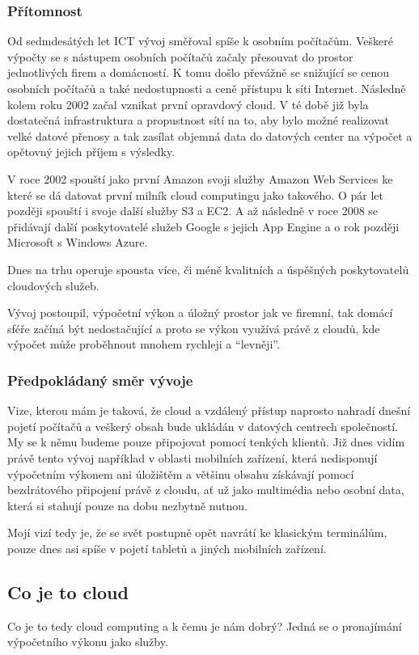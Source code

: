 \subsubsection{Přítomnost}
Od sedmdesátých let ICT vývoj směřoval spíše k osobním počítačům. Veškeré výpočty se s nástupem osobních počítačů začaly přesouvat do prostor jednotlivých firem a domácností. K tomu došlo převážně se snižující se cenou osobních počítačů a také nedostupnosti a ceně přístupu k síti Internet. Následně kolem roku 2002 začal vznikat první opravdový cloud. V té době již byla dostatečná infrastruktura a propustnost sítí na to, aby bylo možné realizovat velké datové přenosy a tak zasílat objemná data do datových center na výpočet a opětovný jejich příjem s výsledky.

V roce 2002 spouští jako první Amazon svoji služby Amazon Web Services ke které se dá datovat první milník cloud computingu jako takového. O pár let později spouští i svoje další služby S3 a EC2. A až následně v roce 2008 se přidávají další poskytovatelé služeb Google s jejich App Engine a o rok později Microsoft s Windows Azure.

Dnes na trhu operuje spousta více, či méně kvalitních a úspěšných poskytovatelů cloudových služeb.

Vývoj postoupil, výpočetní výkon a úložný prostor jak ve firemní, tak domácí sféře začíná být nedostačující a proto se výkon využívá právě z cloudů, kde výpočet může proběhnout mnohem rychleji a "`levněji"'.

\subsubsection{Předpokládaný směr vývoje}
Vize, kterou mám je taková, že cloud a vzdálený přístup naprosto nahradí dnešní pojetí počítačů a veškerý obsah bude ukládán v datových centrech společností. My se k němu budeme pouze připojovat pomocí tenkých klientů. Již dnes vidím právě tento vývoj například v oblasti mobilních zařízení, která nedisponují výpočetním výkonem ani úložištěm a většinu obsahu získávají pomocí bezdrátového připojení právě z cloudu, ať už jako multimédia nebo osobní data, která si stahují pouze na dobu nezbytně nutnou.

Mojí vizí tedy je, že se svět postupně opět navrátí ke klasickým terminálům, pouze dnes asi spíše v pojetí tabletů a jiných mobilních zařízení.

\subsection{Co je to cloud}
Co je to tedy cloud computing a k čemu je nám dobrý? Jedná se o pronajímání výpočetního výkonu jako služby.

